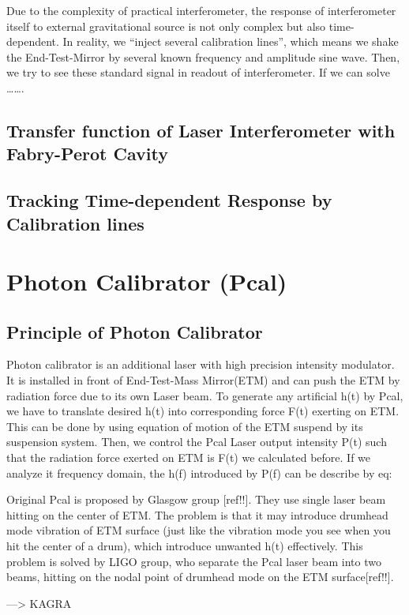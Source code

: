 \documentclass[12pt]{caltech_thesis}
\begin{document}
Due to the complexity of practical interferometer, the response of interferometer itself to external gravitational source is not only complex but also time-dependent. In reality, we “inject several calibration lines”, which means we shake the End-Test-Mirror by several known frequency and amplitude sine wave. Then, we try to see these standard signal in readout of interferometer. If we can solve 
……. 


\subsection{Transfer function of Laser Interferometer with Fabry-Perot Cavity}
\subsection{Tracking Time-dependent Response by Calibration lines}



\section{Photon Calibrator (Pcal)}
\subsection{Principle of Photon Calibrator}
Photon calibrator is an additional laser with high precision intensity modulator. It is installed in front of End-Test-Mass Mirror(ETM) and can push the ETM by radiation force due to its own Laser beam. To generate any artificial h(t) by Pcal, we have to translate desired h(t) into corresponding force F(t) exerting on ETM. This can be done by using equation of motion of the ETM suspend by its suspension system. Then, we control the Pcal Laser output intensity P(t) such that the radiation force exerted on ETM is F(t) we calculated before. If we analyze it frequency domain,  the h(f) introduced by P(f) can be describe by eq:

Original Pcal is proposed by Glasgow group [ref!!]. They use single laser beam hitting on the center of ETM. The problem is that it may introduce drumhead mode vibration of ETM surface (just like the vibration mode you see when you hit the center of a drum), which introduce unwanted h(t) effectively. This problem is solved by LIGO group, who separate the Pcal laser beam into two beams, hitting on the nodal point of drumhead mode on the ETM surface[ref!!].  

 —> KAGRA
\end{document}
